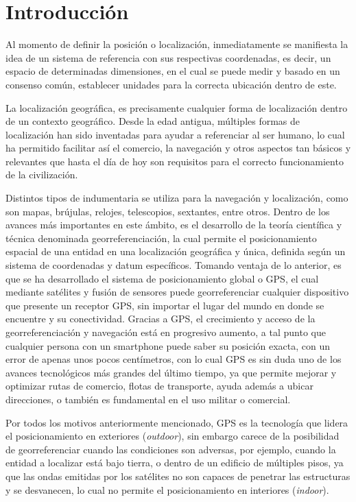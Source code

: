 
\chapter{Introducción}

Al momento de definir la posición o localización, inmediatamente se manifiesta la idea de un sistema de referencia con sus respectivas coordenadas, es decir, un espacio de determinadas dimensiones, en el cual se puede medir y basado en un consenso común, establecer unidades para la correcta ubicación dentro de este.

La localización geográfica, es precisamente cualquier forma de localización dentro de un contexto geográfico. Desde la edad antigua, múltiples formas de localización han sido inventadas para ayudar a referenciar al ser humano, lo cual ha permitido facilitar así el comercio, la navegación y otros aspectos tan básicos y relevantes que hasta el día de hoy son requisitos para el correcto funcionamiento de la civilización.

Distintos tipos de indumentaria se utiliza para la navegación y localización, como son mapas, brújulas, relojes, telescopios, sextantes, entre otros. Dentro de los avances más importantes en este ámbito, es el desarrollo de la teoría científica y técnica denominada georreferenciación, la cual permite el posicionamiento espacial de una entidad en una localización geográfica y única, definida según un sistema de coordenadas y datum específicos. Tomando ventaja de lo anterior, es que se ha desarrollado el sistema de posicionamiento global o GPS, el cual mediante satélites y fusión de sensores puede georreferenciar cualquier dispositivo que presente un receptor GPS, sin importar el lugar del mundo en donde se encuentre y su conectividad. Gracias a GPS, el crecimiento y acceso de la georreferenciación y navegación está en progresivo aumento, a tal punto que cualquier persona con un smartphone puede saber su posición exacta, con un error de apenas unos pocos centímetros, con lo cual GPS es sin duda uno de los avances tecnológicos más grandes del último tiempo, ya que permite mejorar y optimizar rutas de comercio, flotas de transporte, ayuda además a ubicar direcciones, o también es fundamental en el uso militar o comercial.

Por todos los motivos anteriormente mencionado, GPS es la tecnología que lidera el posicionamiento en exteriores (\textit{outdoor}), sin embargo carece de la posibilidad de georreferenciar cuando las condiciones son adversas, por ejemplo, cuando la entidad a localizar está bajo tierra, o dentro de un edificio de múltiples pisos, ya que las ondas emitidas por los satélites no son capaces de penetrar las estructuras y se desvanecen, lo cual no permite el posicionamiento en interiores (\textit{indoor}). 


